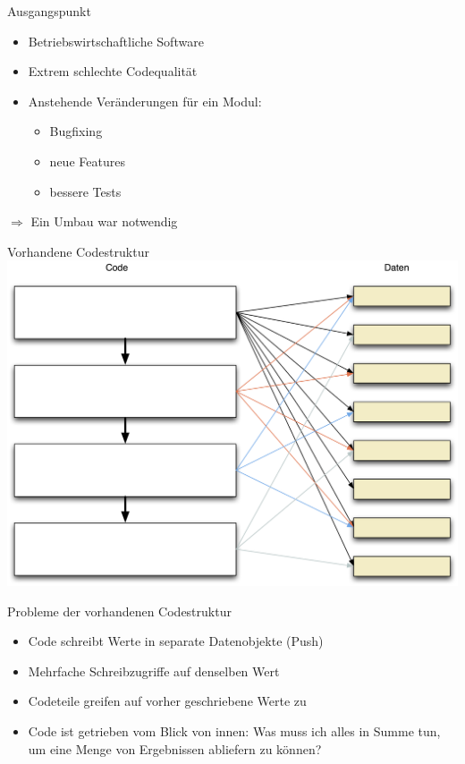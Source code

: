 \begin{frame}[fragile]{Ausgangspunkt}
\begin{itemize}
\item Betriebswirtschaftliche Software
\item Extrem schlechte Codequalität
\item Anstehende Veränderungen für ein Modul:
\begin{itemize}
\item Bugfixing
\item neue Features
\item bessere Tests
\end{itemize}
\end{itemize}

$\Rightarrow$ Ein Umbau war notwendig
\end{frame}

\begin{frame}[fragile]{Vorhandene Codestruktur}
\includegraphics[width=.8 \paperwidth]{Codestruktur.png}
\end{frame}

\begin{frame}[fragile]{Probleme der vorhandenen Codestruktur}
\begin{itemize}
\item Code schreibt Werte in separate Datenobjekte (\glqq Push\grqq{})
\item Mehrfache Schreibzugriffe auf denselben Wert
\item Codeteile greifen auf vorher geschriebene Werte zu
\item Code ist getrieben vom Blick von innen: Was muss ich alles in Summe tun, um eine Menge von Ergebnissen abliefern zu können?
\end{itemize}
\end{frame}



